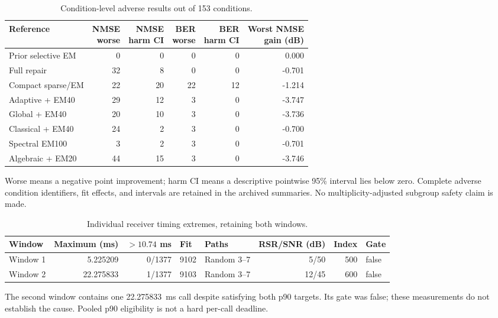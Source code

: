 \begin{table}[!t]
\centering
\caption{Condition-level adverse results out of 153 conditions.}
\label{tab:reliability-harms}
\small
\setlength{\tabcolsep}{4pt}
\begin{tabular}{lrrrrr}
\toprule
Reference & \shortstack{NMSE\\worse} & \shortstack{NMSE\\harm CI} & \shortstack{BER\\worse} & \shortstack{BER\\harm CI} & \shortstack{Worst NMSE\\gain (dB)} \\
\midrule
Prior selective EM & 0 & 0 & 0 & 0 & 0.000 \\
Full repair & 32 & 8 & 0 & 0 & -0.701 \\
Compact sparse/EM & 22 & 20 & 22 & 12 & -1.214 \\
Adaptive + EM40 & 29 & 12 & 3 & 0 & -3.747 \\
Global + EM40 & 20 & 10 & 3 & 0 & -3.736 \\
Classical + EM40 & 24 & 2 & 3 & 0 & -0.700 \\
Spectral EM100 & 3 & 2 & 3 & 0 & -0.701 \\
Algebraic + EM20 & 44 & 15 & 3 & 0 & -3.746 \\
\bottomrule
\end{tabular}
\par\vspace{2pt}
\begin{minipage}{0.98\textwidth}\footnotesize Worse means a negative point improvement; harm CI means a descriptive pointwise 95\% interval lies below zero. Complete adverse condition identifiers, fit effects, and intervals are retained in the archived summaries. No multiplicity-adjusted subgroup safety claim is made.\end{minipage}
\end{table}
\begin{table}[!t]
\centering
\caption{Individual receiver timing extremes, retaining both windows.}
\label{tab:reliability-latency}
\small
\setlength{\tabcolsep}{4pt}
\begin{tabular}{lrrllrrl}
\toprule
Window & Maximum (ms) & $>10.74$ ms & Fit & Paths & RSR/SNR (dB) & Index & Gate \\
\midrule
Window 1 & 5.225209 & 0/1377 & 9102 & Random 3--7 & 5/50 & 500 & false \\
Window 2 & 22.275833 & 1/1377 & 9103 & Random 3--7 & 12/45 & 600 & false \\
\bottomrule
\end{tabular}
\par\vspace{2pt}
\begin{minipage}{0.98\textwidth}\footnotesize The second window contains one 22.275833~ms call despite satisfying both p90 targets. Its gate was false; these measurements do not establish the cause. Pooled p90 eligibility is not a hard per-call deadline.\end{minipage}
\end{table}
